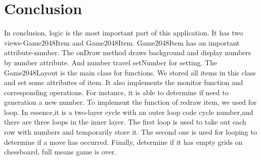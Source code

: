 \documentclass[10pt, a4paper]{article}
\begin{document}
    \section{Conclusion}	
    In conclusion, logic is the most important part of this application. It has two views-Game2048Item and Game2048Item. Game2048Item has an important attribute-number. The onDraw method draws background and display numbers by number attribute. And number travel setNumber for setting. The Game2048Layout is the main class for functions. We stored all items in this class and set some attributes of item. It also implements the monitor function and corresponding operations. For instance, it is able to determine if need to generation a new number. To implement the function of redraw item, we used for loop. In essence,it is a two-layer cycle with an outer loop code cycle number,and there are three loops in the inner layer. The first loop is used to take out each row with numbers and temporarily store it. The second one is used for looping to determine if a move has occurred. Finally, determine if it has empty grids on chessboard, full means game is over.
    

		
\end{document}
